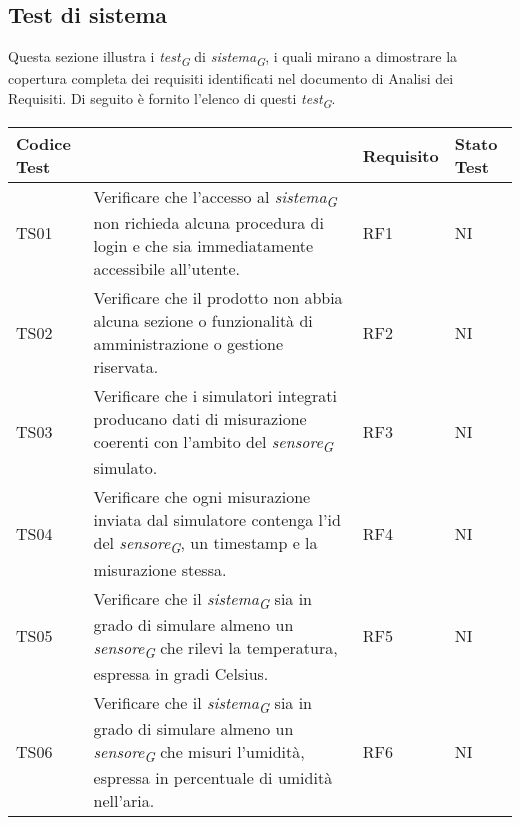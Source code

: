 \subsection{Test di sistema}
Questa sezione illustra i \textit{test}\textsubscript{\textit{G}} di \textit{sistema}\textsubscript{\textit{G}}, i quali mirano a dimostrare la copertura completa dei requisiti identificati nel documento di Analisi dei Requisiti. Di seguito è fornito l'elenco di questi \textit{test}\textsubscript{\textit{G}}.

\vspace{0.4cm}

\begin{longtable}{|C{1.9cm}|L{5cm}|C{2cm}|C{2cm}|}
    \hline
    \textbf{Codice Test} &  & \textbf{Requisito} & \textbf{Stato Test} \\
    \hline \hline

    TS01 & Verificare che l'accesso al \textit{sistema}\textsubscript{\textit{G}} non richieda alcuna procedura di login e che sia immediatamente accessibile all'utente. & RF1 & NI \\
    \hline

    TS02 & Verificare che il prodotto non abbia alcuna sezione o funzionalità di amministrazione o gestione riservata. & RF2 & NI \\
    \hline

    TS03 & Verificare che i simulatori integrati producano dati di misurazione coerenti con l'ambito del \textit{sensore}\textsubscript{\textit{G}} simulato. & RF3 & NI \\
    \hline

    TS04 & Verificare che ogni misurazione inviata dal simulatore contenga l'id del \textit{sensore}\textsubscript{\textit{G}}, un timestamp e la misurazione stessa. & RF4 & NI \\
    \hline

    TS05 & Verificare che il \textit{sistema}\textsubscript{\textit{G}} sia in grado di simulare almeno un \textit{sensore}\textsubscript{\textit{G}} che rilevi la temperatura, espressa in gradi Celsius. & RF5 & NI \\
    \hline

    TS06 & Verificare che il \textit{sistema}\textsubscript{\textit{G}} sia in grado di simulare almeno un \textit{sensore}\textsubscript{\textit{G}} che misuri l'umidità, espressa in percentuale di umidità nell'aria. & RF6 & NI \\
    \hline


\end{longtable}
